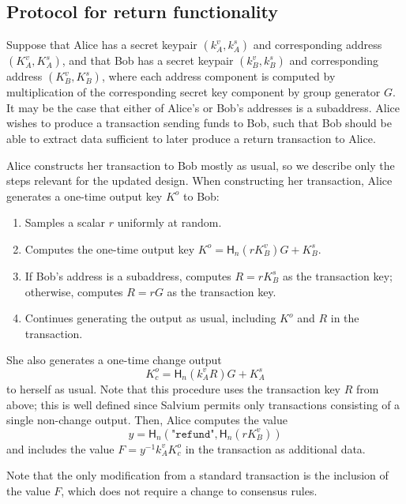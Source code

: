 \documentclass{article}
\newcommand{\hash}{\mathsf{H}_n}
\begin{document}
\subsection{Protocol for return functionality}

Suppose that Alice has a secret keypair $(k_A^v, k_A^s)$ and corresponding address $(K_A^v, K_A^s)$, and that Bob has a secret keypair $(k_B^v, k_B^s)$ and corresponding address $(K_B^v, K_B^s)$, where each address component is computed by multiplication of the corresponding secret key component by group generator $G$.
It may be the case that either of Alice's or Bob's addresses is a subaddress.
Alice wishes to produce a transaction sending funds to Bob, such that Bob should be able to extract data sufficient to later produce a return transaction to Alice.

Alice constructs her transaction to Bob mostly as usual, so we describe only the steps relevant for the updated design.
When constructing her transaction, Alice generates a one-time output key $K^o$ to Bob:
\begin{enumerate}
	\item Samples a scalar $r$ uniformly at random.
	\item Computes the one-time output key $K^o = \hash(r K_B^v) G + K_B^s$.
	\item If Bob's address is a subaddress, computes $R = r K_B^s$ as the transaction key; otherwise, computes $R = r G$ as the transaction key.
	\item Continues generating the output as usual, including $K^o$ and $R$ in the transaction.
\end{enumerate}
She also generates a one-time change output
$$K_c^o = \hash(k_A^v R) G + K_A^s$$
to herself as usual.
Note that this procedure uses the transaction key $R$ from above; this is well defined since Salvium permits only transactions consisting of a single non-change output.
Then, Alice computes the value
$$y = \hash\left( \texttt{"refund"}, \hash(r K_B^v) \right)$$
and includes the value $F = y^{-1} k_A^v K_c^o$ in the transaction as additional data.

Note that the only modification from a standard transaction is the inclusion of the value $F$, which does not require a change to consensus rules.
\end{document}
